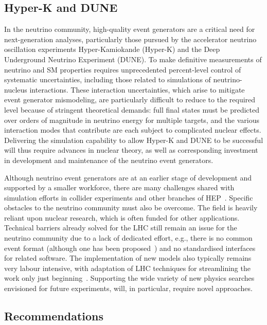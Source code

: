 \documentclass[10pt,a4paper]{article}
\begin{document}
\subsection{Hyper-K and DUNE}\label{hyper-k-and-dune}

In the neutrino community, high-quality event generators are a critical need for
next-generation analyses, particularly those pursued by the accelerator neutrino
oscillation experiments Hyper-Kamiokande (Hyper-K) and the Deep Underground
Neutrino Experiment (DUNE). To make definitive measurements of neutrino and SM
properties requires unprecedented percent-level control of systematic
uncertainties, including those related to simulations of neutrino-nucleus
interactions. These interaction uncertainties, which arise to mitigate event
generator mismodeling, are particularly difficult to reduce to the required
level because of stringent theoretical demands: full final states must be
predicted over orders of magnitude in neutrino energy for multiple targets, and
the various interaction modes that contribute are each subject to complicated
nuclear effects. Delivering the simulation capability to allow Hyper-K and DUNE
to be successful will thus require advances in nuclear theory, as well as
corresponding investment in development and maintenance of the neutrino event
generators.

Although neutrino event generators are at an earlier stage of development and
supported by a smaller workforce, there are many challenges shared with
simulation efforts in collider experiments and other branches of
HEP~\cite{campbell2024eg}. Specific obstacles to the neutrino community must also be
overcome. The field is heavily reliant upon nuclear research, which is often
funded for other applications. Technical barriers already solved for the LHC
still remain an issue for the neutrino community due to a lack of dedicated
effort, e.g., there is no common event format (although one has 
been proposed~\cite{gardiner2024nuhepmc}) and no standardised interfaces for related
software. The implementation of new models also typically remains very labour
intensive, with adaptation of LHC techniques for streamlining the work only just
beginning~\cite{PhysRevD.105.096006}. Supporting the
wide variety of new physics searches envisioned for future experiments, will, in
particular, require novel approaches.

\subsection{Recommendations}\label{recommendations}
\end{document}
